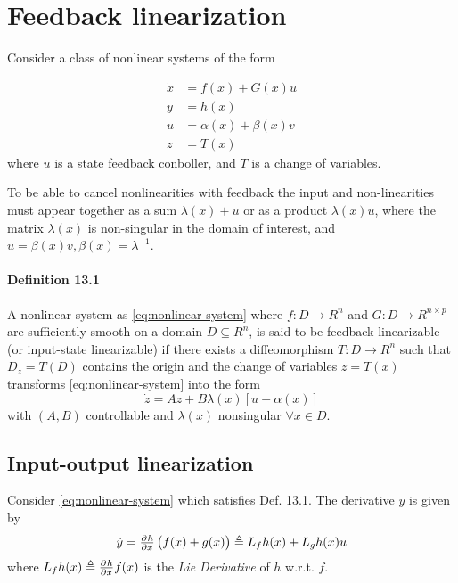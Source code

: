\section{Feedback linearization}
Consider a class of nonlinear systems of the form

\begin{equation}\label{eq:nonlinear-system}
	\begin{split}
		\dot{x} &= f(x) + G(x)u             \\
		y       &= h(x)                     \\
		u       &= \alpha (x) + \beta (x) v \\
		z       &= T(x)
	\end{split}
\end{equation}
where $u$ is a state feedback conboller, and $T$ is a change of variables.

To be able to cancel nonlinearities with feedback the input and non-linearities must appear together as a sum $\lambda (x) + u$ or as a product $\lambda (x) u$, where the matrix $\lambda(x)$ is non-singular in the domain of interest, and $u = \beta(x) v, \beta(x) = \lambda^{-1}$.

\paragraph{Definition 13.1}
A nonlinear system as \eqref{eq:nonlinear-system} where $f:D \to R^n$ and $G : D \to R^{n \times p}$ are sufficiently smooth on a domain $D \subseteq R^n$, is said to be feedback linearizable  (or input-state linearizable) if there exists a diffeomorphism $T:D \to R^n$ such that $D_z = T(D)$ contains the origin and the change of variables $z = T(x)$ transforms \eqref{eq:nonlinear-system} into the form
\begin{equation}
	\dot{z} = Az + B\lambda (x) [u - \alpha(x)]
\end{equation}
with $(A,B)$ controllable and $\lambda(x)$ nonsingular $\forall x \in D$.

\subsection{Input-output linearization}
Consider \eqref{eq:nonlinear-system} which satisfies Def. 13.1. The derivative $\dot{y}$ is given by
\begin{equation}
	\dot{y} = \pd{h}{x} \del{f(x) + g(x)} \triangleq L_f h(x) + L_g h(x) u
\end{equation}
where $L_f h(x) \triangleq \pd{h}{x} f(x) $ is the \emph{Lie Derivative} of $h$ w.r.t. $f$.

